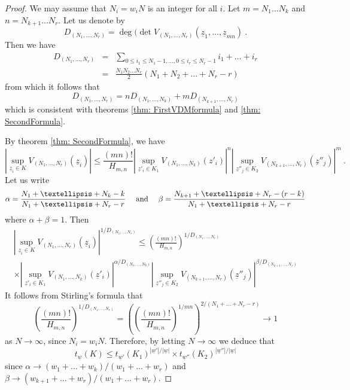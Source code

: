 \documentclass[10pt,a4paper]{amsart}
\newcommand{\To}{\longrightarrow}
\newcommand{\z}{\underline{z}}
\begin{document}
\begin{proof} We may assume that $N_i=w_i N $ is an integer for all $i$.  Let $m=  N_1\ldots N_k$ and $n=  N_{k+1}\ldots N_r$. Let us denote by 
\begin{equation}
D_{(N_1,\ldots ,N_r)}  =      \deg (\det V_{(N_1,\ldots,  N_r)}(\z_1,\ldots, 
\z_{mn}) \ . 
\end{equation}
Then we have 
\begin{eqnarray}  D_{(N_1,\ldots ,N_r)}  &=  & \sum_{ 0 \leq i_1\leq  N_1-1, \ldots,   0 \leq i_r\leq N_r-1} i_1+ \ldots +i_r   \\
& =&  \frac{N_1 N_2 \ldots N_r}{2} ( N_1+ N_2 + \ldots +  N_r - r )  \nonumber
\end{eqnarray} 
from which it follows that 
\[  D_{(N_1,\ldots ,N_r) }  = n  D_{(N_1,\ldots ,N_k) }   +   m D_{(N_{k+1},\ldots ,N_r)}  \]
which is consistent with theorems \ref{thm: FirstVDMformula} and \ref{thm: SecondFormula}.


 By theorem  \ref{thm: SecondFormula}, we have
\[  \left| \sup_{\z_i \in K} V_{(N_1,\ldots, N_r)} (\z_i) \right| \leq \frac{(mn)!}{H_{m,n}} \left|  \sup_{\z'_i \in K_1} V_{(N_1,\ldots,N_k)}(z'_i) \right|^{n} \left|  \sup_{\z''_j \in K_2} V_{( N_{k+1},\ldots, N_r)} (\z''_j)\right|^{m}   \ .\]
Let us write 
\[ \alpha  = \frac{ N_1 + \ldots +  N_k - k } {N_1+ \ldots +N_r- r} \quad \hbox{ and } \quad \beta= \frac{  N_{k+1} + \ldots + N_r -(r-k)} {N_1+ \ldots +N_r-r}  \]
where $\alpha+ \beta =1$. Then
\begin{multline*}   \left| \sup_{\z_i \in K} V_{( N_1,\ldots, N_r)} (\z_i) \right|^{1/D_{(N_1,\ldots, N_r)}} \leq  \left( \frac{(mn)!}{H_{m,n}}\right)^{1/D_{(N_1,\ldots, N_r)}}\\
 \times  \left|  \sup_{\z'_i \in K_1} V_{(N_1,\ldots, N_k)}(\z'_i) \right|^{\alpha / D_{(N_1,\ldots, N_k) }} \left|  \sup_{\z''_j \in K_2} V_{(N_{k+1},\ldots,  N_r)} (\z''_j)\right|^{\beta / D_{(N_{k+1},\ldots, N_{r})}} \end{multline*}
 It  follows from  Stirling's formula that
  \[   \left( \frac{(mn)!}{H_{m,n}}\right)^{1/D_{(N_1,\ldots, N_r) }}  = \left( \left(\frac{(mn)!}{H_{m,n}}\right)^{1/mn} \right)^{2/{(N_1+\ldots+ N_r-r)}} \To 1\]
 as $N\rightarrow \infty$, since    $N_i = w_i N$.  Therefore, by letting $N\rightarrow \infty$ we deduce that 
  \[  t_{\underline{w}}(K) \leq  t_{\underline{w}'}(K_1)^{|\underline{w}'|/|\underline{w}|} \times t_{\underline{w}''}(K_2)^{|\underline{w}''|/|\underline{w}|} \]
since $\alpha \rightarrow   (w_1+\ldots +w_k)/(w_1+\ldots +w_r)  $ and $\beta \rightarrow (w_{k+1}+\ldots +w_r)/(w_1+\ldots +w_r)$.


\end{proof}
\end{document}
